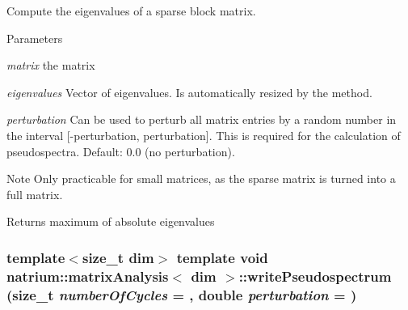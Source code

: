 Compute the eigenvalues of a sparse block matrix. 
\begin{DoxyParams}{Parameters}
\item[{\em matrix}]the matrix \item[{\em eigenvalues}]Vector of eigenvalues. Is automatically resized by the method. \item[{\em perturbation}]Can be used to perturb all matrix entries by a random number in the interval \mbox{[}-\/perturbation, perturbation\mbox{]}. This is required for the calculation of pseudospectra. Default: 0.0 (no perturbation). \end{DoxyParams}
\begin{DoxyNote}{Note}
Only practicable for small matrices, as the sparse matrix is turned into a full matrix. 
\end{DoxyNote}
\begin{DoxyReturn}{Returns}
maximum of absolute eigenvalues 
\end{DoxyReturn}
\hypertarget{classnatrium_1_1matrixAnalysis_a2c18eb04461c90bfdf3f301e8c9dfc1b}{
\subsubsection[{writePseudospectrum}]{\setlength{\rightskip}{0pt plus 5cm}template$<$size\_\-t dim$>$ template void {\bf natrium::matrixAnalysis}$<$ dim $>$::writePseudospectrum (size\_\-t {\em numberOfCycles} = {}, \/  double {\em perturbation} = {})}}
\label{classnatrium_1_1matrixAnalysis_a2c18eb04461c90bfdf3f301e8c9dfc1b}


